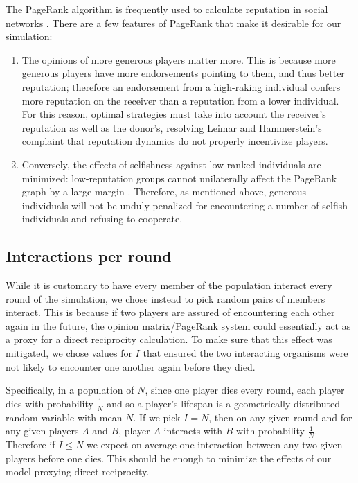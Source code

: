 \documentclass{amsart}
\begin{document}
The PageRank algorithm is frequently used to calculate reputation in
social networks \cite{pujol_extracting_2002}. There are a few features
of PageRank that make it desirable for our simulation:
\begin{enumerate}
\item
The opinions of more generous players matter more. This is because
more generous players have more endorsements pointing to them, and
thus better reputation; therefore an endorsement from a high-raking
individual confers more reputation on the receiver than a reputation
from a lower individual. For this reason, optimal strategies must take
into account the receiver's reputation as well as the donor's,
resolving Leimar and Hammerstein's complaint
\cite{leimar_evolution_2001} that reputation dynamics do not properly
incentivize players.
\item
Conversely, the effects of selfishness against low-ranked individuals
are minimized: low-reputation groups cannot unilaterally affect the
PageRank graph by a large margin
\cite{langville_deeper_2004}. Therefore, as mentioned above, generous
individuals will not be unduly penalized for encountering a number of
selfish individuals and refusing to cooperate.
\end{enumerate}

\subsection{Interactions per round}

While it is customary to have every member of the population interact
every round of the simulation, we chose instead to pick random pairs
of members interact. This is because if two players are assured of
encountering each other again in the future, the opinion
matrix/PageRank system could essentially act as a proxy for a direct
reciprocity calculation. To make sure that this effect was mitigated,
we chose values for $I$ that ensured the two interacting organisms
were not likely to encounter one another again before they died.

Specifically, in a population of $N$, since one player dies every
round, each player dies with probability $\frac1N$ and so a player's
lifespan is a geometrically distributed random variable with mean
$N$. If we pick $I=N$, then on any given round and for any given
players $A$ and $B$, player $A$ interacts with $B$ with probability
$\frac1N$. Therefore if $I\le N$ we expect on average one interaction
between any two given players before one dies. This should be enough
to minimize the effects of our model proxying direct reciprocity.
\end{document}
